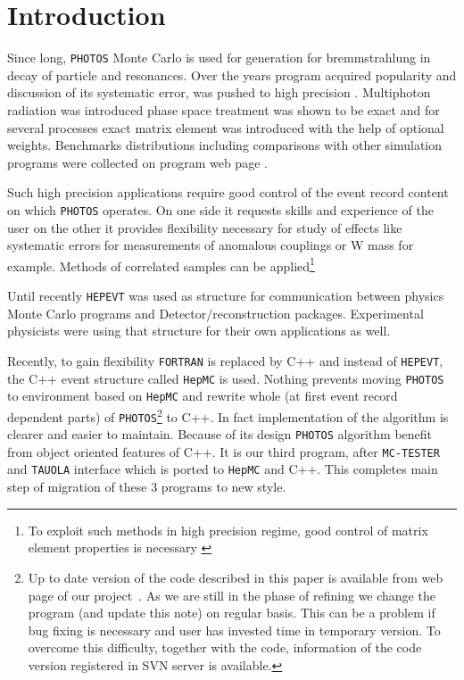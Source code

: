 \documentclass[]{Photos_interface_design}
\begin{document}
\maketitle

\tableofcontents{}

\newpage

\section{Introduction}
Since long, {\tt PHOTOS} Monte Carlo \cite{Barberio:1990ms,Barberio:1993qi} is used for generation for bremmstrahlung in decay of particle and resonances. Over the years program acquired
popularity and discussion of its systematic error, was pushed to high 
precision \cite{Golonka:2006tw}. Multiphoton radiation was introduced \cite{Golonka:2005pn} phase space treatment was shown to be exact \cite{Nanava:2006vv} and for several processes \cite{Golonka:2006tw,Nanava:2006vv,Nanava:2009vg}
exact matrix element was introduced with the help of optional weights.
Benchmarks distributions including comparisons with  
other simulation programs were collected on program web page \cite{Photos_tests}. 

 Such high precision applications require good control of the event record content on which {\tt PHOTOS} operates. On one side it 
requests skills and experience of the user on the other it provides 
flexibility necessary for study of effects like systematic errors for 
measurements of anomalous couplings or W mass for example. Methods of 
correlated samples  can be applied\footnote{To exploit such methods in 
high precision regime, good control of matrix element properties is necessary
\cite{Kleiss:1990jv}} 

Until recently {\tt HEPEVT} was used as structure for 
communication between physics Monte Carlo programs and Detector/reconstruction 
packages. Experimental physicists were using that structure 
for their own applications  as well.

Recently, to gain  flexibility {\tt FORTRAN} is  replaced by C++ and 
instead of {\tt HEPEVT}, the C++ event structure called {\tt HepMC} \cite{Dobbs:2001ck}
is used. Nothing prevents 
moving {\tt PHOTOS} to environment based on  {\tt HepMC}
 and rewrite whole (at first event record dependent parts) 
of {\tt PHOTOS}\footnote{Up to date version of the code described in this paper is
available from web page of our project~\cite{photosC++}. 
As we are still in the phase of refining
we change the program (and update this note) on regular basis. 
This can be a problem if bug fixing is necessary and user has invested time 
in temporary version. To overcome this difficulty, 
together with the code, information of the code version registered in 
SVN server is available.  }
 to C++. In fact implementation of the algorithm is clearer and easier to
 maintain. Because of its design {\tt PHOTOS} algorithm benefit from object 
oriented features of C++. It is our third program, after {\tt MC-TESTER} \cite{Davidson:2008ma}
and {\tt TAUOLA} interface \cite{Davidson:2010rw} which is ported to {\tt HepMC} and C++.
This completes main step of migration of these 3 programs to new style.
\end{document}
